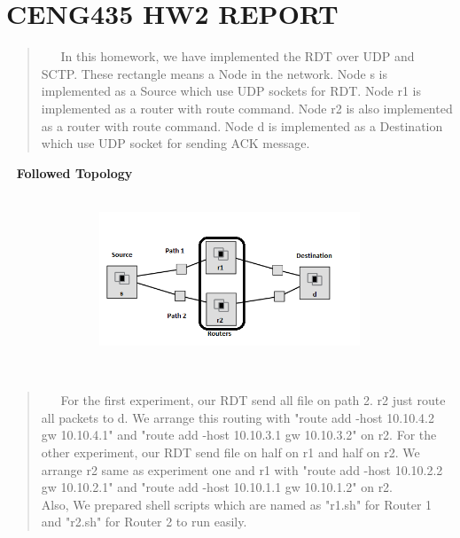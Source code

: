 \documentclass[12pt]{article}
\begin{document}
\section*{CENG435 HW2 REPORT} 


\begin{quote}
$\ \  \ \ \ \ \ $In this homework, we have implemented the RDT over UDP and SCTP.
These rectangle means a Node in the network.
Node s is implemented as a Source which use UDP sockets for RDT.
Node r1 is implemented as a router with route command.
Node r2 is also implemented as a router with route command.
Node d is implemented as a Destination which use UDP socket for sending ACK message.
\end{quote}


\
\centering
\large
\textbf{Followed Topology}

\
\
\includegraphics[width = 170mm, height = 40mm]{topology}

\
\


\normalsize
\begin{quote}
$\ \  \ \ \ \ \ $For the first experiment, our RDT send all file on path 2. r2 just route all packets to d. We arrange this routing with "route add -host 10.10.4.2 gw 10.10.4.1" and "route add -host 10.10.3.1 gw 10.10.3.2" on r2. For the other experiment, our RDT send file on half on r1 and half on r2. We arrange r2 same as experiment one and r1 with "route add -host 10.10.2.2 gw 10.10.2.1" and "route add -host 10.10.1.1 gw 10.10.1.2" on r2.
\\
Also, We prepared shell scripts which are named as "r1.sh" for Router 1 and "r2.sh" for Router 2 to run easily.
\end{quote}
\end{document}
